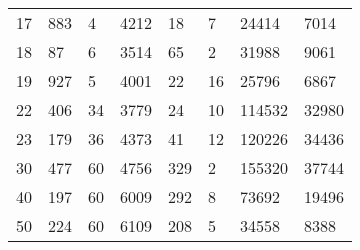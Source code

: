 \documentclass{article}
\begin{document}
\begin{itemize}
\begin{table}[]
\begin{tabular}{llllllll}
17	    &   883     &	4           & 	4212        &	18	                &   7	    &   24414           &	7014            \\
18	    &   87      &	6           & 	3514        &	65                  &	2       &	31988           &	9061            \\
19      &	927     &	5           & 	4001        &	22                  &	16      &	25796           &	6867            \\
22      &	406     &	34          & 	3779        &	24                  &	10      &	114532	        &   32980           \\
23	    &   179	    &   36          & 	4373        &	41                  &  	12      &	120226          &	34436           \\
30      &	477     &	60          & 	4756        &	329                 &	2       &	155320          &	37744           \\
40      &  	197     &	60          & 	6009        &	292                 &	8       &	73692           &	19496           \\
50      &	224     &	60          & 	6109        &	208                 &	5       &	34558           &	8388            
\end{tabular}
\end{table}
\end{itemize}
\end{document}
